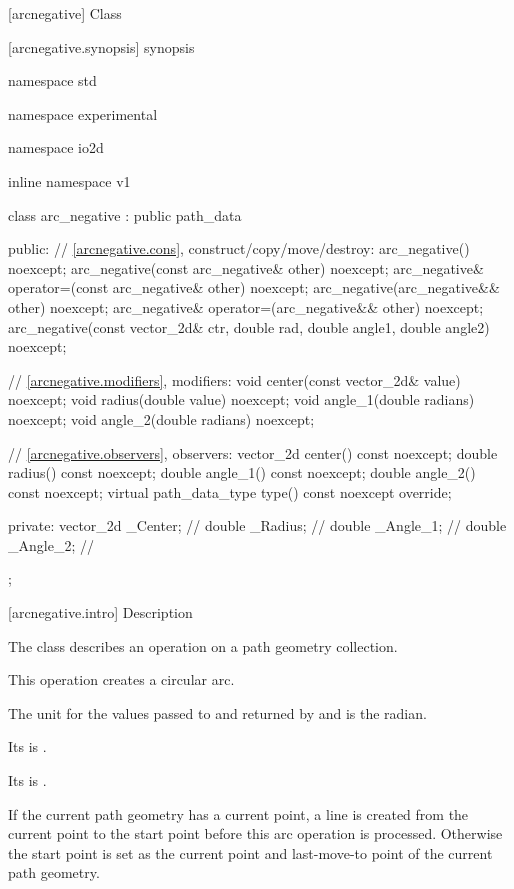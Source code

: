  [arcnegative] {Class }

 [arcnegative.synopsis] { synopsis}

\begin{codeblock}
namespace std { namespace experimental { namespace io2d { inline namespace v1 {
  class arc_negative : public path_data {
  public:
    // \ref{arcnegative.cons}, construct/copy/move/destroy:
    arc_negative() noexcept;
    arc_negative(const arc_negative& other) noexcept;
    arc_negative& operator=(const arc_negative& other) noexcept;
    arc_negative(arc_negative&& other) noexcept;
    arc_negative& operator=(arc_negative&& other) noexcept;
    arc_negative(const vector_2d& ctr, double rad, double angle1,
      double angle2) noexcept;

    // \ref{arcnegative.modifiers}, modifiers:
    void center(const vector_2d& value) noexcept;
    void radius(double value) noexcept;
    void angle_1(double radians) noexcept;
    void angle_2(double radians) noexcept;

    // \ref{arcnegative.observers}, observers:
    vector_2d center() const noexcept;
    double radius() const noexcept;
    double angle_1() const noexcept;
    double angle_2() const noexcept;
    virtual path_data_type type() const noexcept override;

  private:
    vector_2d _Center;   // \expos
    double _Radius;  // \expos
    double _Angle_1; // \expos
    double _Angle_2; // \expos
  };
} } } }
\end{codeblock}

 [arcnegative.intro] { Description}

\pnum
{}
The class  describes an operation on a path geometry collection.

\pnum
This operation creates a circular arc.

\pnum
The unit for the values passed to and returned by  and  is the radian.

\pnum
Its  is .

\pnum
Its  is .

\pnum
If the current path geometry has a current point, a line is created from the current point to the start point before this arc operation is processed. Otherwise the start point is set as the current point and last-move-to point of the current path geometry.

